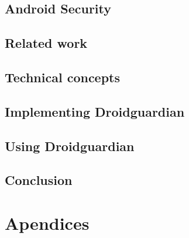 \documentclass[
  oneside,
  11pt, a4paper,
  footinclude=true,
  headinclude=true,
  cleardoublepage=empty
]{scrbook}
\begin{document}
\chapter{Android Security}
\label{chap:android_security}


\chapter{Related work}
\label{chap:background}


\chapter{Technical concepts}
\label{chap:technical_concepts}


\chapter{Implementing Droidguardian}
\label{chap:implementing_dg}


\chapter{Using Droidguardian}
\label{chap:using_dg}


\chapter{Conclusion}
\label{chap:conclusion}


\cleardoublepage


\printindex
	
	\appendix
	\renewcommand\chaptername{Appendix}


\part{Apendices}
\end{document}

